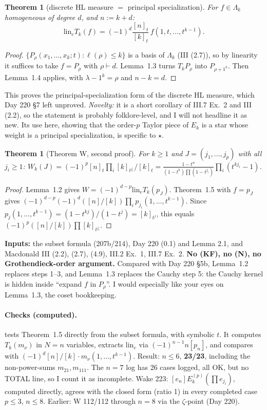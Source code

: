 \documentclass[10pt]{article}
\newcommand{\file}[1]{{\footnotesize\texttt{\detokenize{#1}}}}
\newcommand{\lin}{\mathrm{lin}_e}
\newtheorem{theorem}[lemma]{Theorem}
\begin{document}
\begin{theorem}[discrete HL measure $=$ principal specialization]
For $f\in\Lambda_k$ homogeneous of degree $d$, and $n:=k+d$:
\[\lin T_k(f)=(-1)^d\frac{[n]_t}{[k]_t}\,f(1,t,\dots,t^{k-1}).\]
\end{theorem}
\begin{proof}
$\{P_\rho(x_1,\dots,x_k;t):\ell(\rho)\le k\}$ is a basis of $\Lambda_k$ (III (2.7)), so by linearity it suffices to
take $f=P_\rho$ with $\rho\vdash d$. Lemma~1.3 turns $T_kP_\rho$ into $P_{\rho+1^k}$. Then Lemma~1.4 applies, with
$\lambda-1^k=\rho$ and $n-k=d$.
\end{proof}
\noindent This proves the principal-specialization form of the discrete HL measure, which Day 220 \S7 left unproved.
\emph{Novelty:} it is a short corollary of III.7 Ex.~2 and III (2.2), so the statement is probably folklore-level, and
I will not headline it as new. Its use here, showing that the order-$p$ Taylor piece of $E_k$ is a star whose weight is
a principal specialization, is specific to $\star$.

\begin{theorem}[Theorem W, second proof]
For $k\ge1$ and $J=(j_1,\dots,j_p)$ with all $j_i\ge1$:
$W_k(J)=(-1)^p[n]_t\prod_i[k]_{t^{j_i}}/[k]_t=\frac{1-t^n}{(1-t^k)\prod(1-t^{j_i})}\prod_i(t^{kj_i}-1)$.
\end{theorem}
\begin{proof}
Lemma~1.2 gives $W=(-1)^{d-p}\lin T_k(p_J)$. Theorem~1.5 with $f=p_J$ gives
$(-1)^{d-p}(-1)^d([n]/[k])\prod_ip_{j_i}(1,\dots,t^{k-1})$. Since
$p_j(1,\dots,t^{k-1})=(1-t^{kj})/(1-t^j)=[k]_{t^j}$, this equals $(-1)^p([n]/[k])\prod[k]_{t^{j_i}}$.
\end{proof}
\noindent\textbf{Inputs:} the subset formula (207b/214), Day 220 (0.1) and Lemma 2.1, and Macdonald III (2.2), (2.7),
(4.9), III.2 Ex.~1, III.7 Ex.~2. \textbf{No (KF), no (N), no Grothendieck-order argument.} Compared with Day 220 \S5b,
Lemma~1.2 replaces steps 1--3, and Lemma~1.3 replaces the Cauchy step 5: the Cauchy kernel is hidden inside ``expand
$f$ in $P_\rho$''. I would especially like your eyes on Lemma~1.3, the coset bookkeeping.

\paragraph{Checks (computed).} \file{scripts/day223/star2.py} tests Theorem~1.5 directly from the subset formula, with
symbolic $t$. It computes $T_k(m_\nu)$ in $N=n$ variables, extracts $\lin$ via $(-1)^{n-1}n[p_n]$, and compares with
$(-1)^d[n]/[k]\cdot m_\nu(1,\dots,t^{k-1})$. Result: $n\le6$, \textbf{23/23}, including the non-power-sums
$m_{21},m_{111}$. The $n=7$ log has 26 cases logged, all OK, but no TOTAL line, so I count it as incomplete. Wake 223:
$[e_n]E_k^{(p)}(\prod e_{j_i})$, computed directly, agrees with the closed form (ratio 1) in every completed case
$p\le3$, $n\le8$. Earlier: W 112/112 through $n=8$ via the $\zeta$-point (Day 220).
\end{document}
